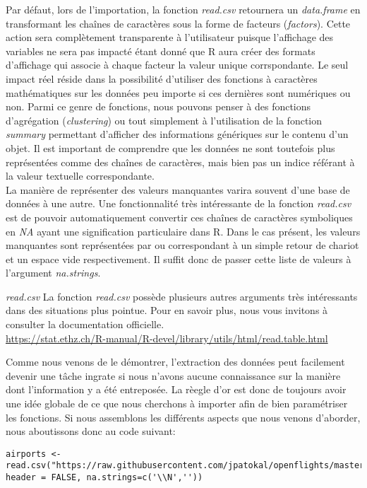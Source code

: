 \noindent
Par défaut, lors de l'importation, la fonction \emph{read.csv} retournera un \emph{data.frame} en transformant les chaînes de caractères sous la forme de facteurs (\emph{factors}). Cette action sera complètement transparente à l'utilisateur puisque l'affichage des variables ne sera pas impacté étant donné que R aura créer des formats d'affichage qui associe à chaque facteur la valeur unique corrspondante. Le seul impact réel réside dans la possibilité d'utiliser des fonctions à caractères mathématiques sur les données peu importe si ces dernières sont numériques ou non. Parmi ce genre de fonctions, nous pouvons penser à des fonctions d'agrégation (\emph{clustering}) ou tout simplement à l'utilisation de la fonction \emph{summary} permettant d'afficher des informations génériques sur le contenu d'un objet. Il est important de comprendre que les données ne sont toutefois plus représentées comme des chaînes de caractères, mais bien pas un indice référant à la valeur textuelle correspondante. \\

\noindent
La manière de représenter des valeurs manquantes varira souvent d'une base de données à une autre. Une fonctionnalité très intéressante de la fonction \emph{read.csv} est de pouvoir automatiquement convertir ces chaînes de caractères symboliques en \emph{NA} ayant une signification particulaire dans R. Dans le cas présent, les valeurs manquantes sont représentées par  ou  correspondant à un simple retour de chariot et un espace vide respectivement. Il suffit donc de passer cette liste de valeurs à l'argument \emph{na.strings}. \\

\begin{moreInfo}{\emph{read.csv}}
	La fonction \emph{read.csv} possède plusieurs autres arguments très intéressants dans des situations plus pointue. Pour en savoir plus, nous vous invitons à consulter la documentation officielle. \\
	\url{https://stat.ethz.ch/R-manual/R-devel/library/utils/html/read.table.html}
\end{moreInfo}

\noindent
Comme nous venons de le démontrer, l'extraction des données peut facilement devenir une tâche ingrate si nous n'avons aucune connaissance sur la manière dont l'information y a été entreposée. La rèegle d'or est donc de toujours avoir une idée globale de ce que nous cherchons à importer afin de bien paramétriser les fonctions. Si nous assemblons les différents aspects que nous venons d'aborder, nous aboutissons donc au code suivant:
\begin{lstlisting}[caption = Extraction des données,label=src:Extraction]
	airports <- read.csv("https://raw.githubusercontent.com/jpatokal/openflights/master/data/airports.dat", header = FALSE, na.strings=c('\\N',''))
\end{lstlisting}

